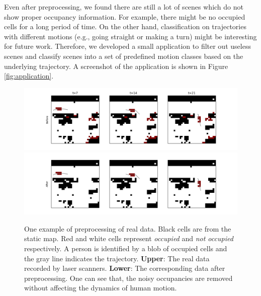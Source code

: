 Even after preprocessing, we found there are still a lot of scenes which do not show proper occupancy information. For example, there might be no occupied cells for a long period of time. On the other hand, classification on trajectories with different motions (e.g., going straight or making a turn) might be interesting for future work. Therefore, we developed a small application to filter out useless scenes and classify scenes into a set of predefined motion classes based on the underlying trajectory. A screenshot of the application is shown in Figure \ref{fig:application}.

\begin{figure}[ht]
\includegraphics[width=\textwidth]{figures/before.png} \\
\includegraphics[width=\textwidth]{figures/after.png}
\caption[One example of preprocessing of real data.]{One example of preprocessing of real data. Black cells are from the static map. Red and white cells represent \textit{occupied} and \textit{not occupied} respectively. A person is identified by a blob of occupied cells and the gray line indicates the trajectory. \textbf{Upper}: The real data recorded by laser scanners. \textbf{Lower}: The corresponding data after preprocessing. One can see that, the noisy occupancies are removed without affecting the dynamics of human motion.} 
\label{fig:preprocessing}
\end{figure}

